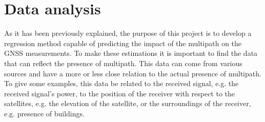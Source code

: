 \documentclass[a4paper, report, oneside, UKenglish]{memoir}
\begin{document}

        


\chapter{Data analysis}\label{ch:data_analysis}

As it has been previously explained, the purpose of this project is to develop a regression method capable of predicting the impact of the multipath on the GNSS measurements. To make these estimations it is important to find the data that can reflect the presence of multipath.
This data can come from various sources and have a more or less close relation to the actual presence of multipath. To give some examples, this data be related to the received signal, e.g. the received signal's power, to the position of the receiver with respect to the satellites, e.g. the elevation of the satellite, or the surroundings of the receiver, e.g. presence of buildings. 
\end{document}
